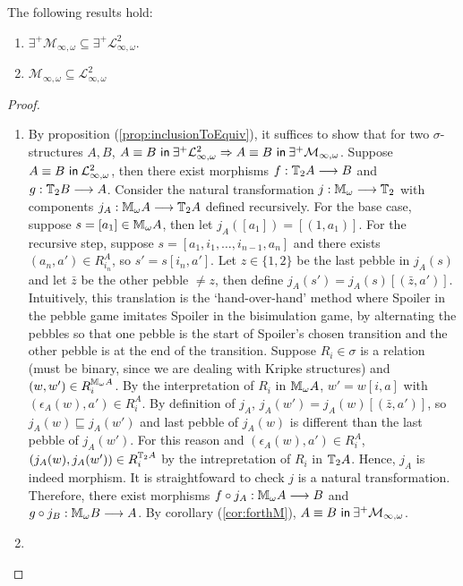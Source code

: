 \begin{prop}
The following results hold:
\begin{enumerate}[label=(\arabic*)]
\item $\exists^{+}\mathcal{M}_{\infty,\omega} \subseteq \exists^{+}\mathcal{L}^{2}_{\infty,\omega}$.
\item $\mathcal{M}_{\infty,\omega} \subseteq \mathcal{L}^{2}_{\infty,\omega}$
\end{enumerate}
\begin{proof}
\begin{enumerate}[label=(\arabic*)]
\item By proposition (\ref{prop:inclusionToEquiv}), it suffices to show that for two $\sigma$-structures $A,B$, ${A \equiv B \ \mathsf{in}\: \exists^{+}\mathcal{L}^{2}_{\infty,\omega}} \Rightarrow {A \equiv B \ \mathsf{in}\: \exists^{+}\mathcal{M}_{\infty,\omega}}$. Suppose ${A \equiv B \ \mathsf{in}\: \mathcal{L}^{2}_{\infty,\omega}}$, then there exist morphisms $f:{\mathbb{T}_{2}A} \longrightarrow B$ and $g:{\mathbb{T}_{2}B} \longrightarrow A$. Consider the natural transformation $j:{\mathbb{M}_{\omega}} \longrightarrow {\mathbb{T}_{2}}$ with components $j_{A}:{\mathbb{M}_{\omega}A} \longrightarrow {\mathbb{T}_{2}A}$ defined recursively. For the base case, suppose $s = [a_{1}] \in {\mathbb{M}_{\omega}A}$, then let $j_{A}([a_{1}]) = [(1,a_{1})]$. For the recursive step, suppose $s = [a_{1},i_{1},\dots,i_{n-1},a_{n}]$ and there exists $(a_{n},a') \in R_{i_{n}}^{A}$, so $s' = s[i_{n},a']$. Let $z \in \{1,2\}$ be the last pebble in $j_{A}(s)$ and let $\bar{z}$ be the other pebble $\not= z$, then define $j_{A}(s') = j_{A}(s)[(\bar{z},a')]$.  Intuitively, this translation is the `hand-over-hand' method where Spoiler in the pebble game imitates Spoiler in the bisimulation game, by alternating the pebbles so that one pebble is the start of Spoiler's chosen transition and the other pebble is at the end of the transition. Suppose $R_{i} \in \sigma$ is a relation (must be binary, since we are dealing with Kripke structures) and $(w,w') \in R_{i}^{{\mathbb{M}_{\omega}A}}$. By the interpretation of $R_{i}$ in ${\mathbb{M}_{\omega}A}$, $w' = w[i,a]$ with $(\epsilon_{A}(w),a') \in R_{i}^{A}$. By definition of $j_{A}$, $j_{A}(w') = j_{A}(w)[(\bar{z},a')]$, so $j_{A}(w) \sqsubseteq j_{A}(w')$ and last pebble of $j_{A}(w)$ is different than the last pebble of $j_{A}(w')$. For this reason and $(\epsilon_{A}(w),a') \in R_{i}^{A}$, $(j_{A}(w),j_{A}(w')) \in R_{i}^{{\mathbb{T}_{2}A}}$ by the intrepretation of $R_{i}$ in ${\mathbb{T}_{2}A}$. Hence, $j_{A}$ is indeed morphism. It is straightfoward to check $j$ is a natural transformation. Therefore, there exist morphisms $f \circ j_{A}: {\mathbb{M}_{\omega}A} \longrightarrow B$ and $g \circ j_{B}:{\mathbb{M}_{\omega}B} \longrightarrow A$. By corollary (\ref{cor:forthM}), ${A \equiv B \ \mathsf{in}\: \exists^{+}\mathcal{M}_{\infty,\omega}}$. 
\item   
\end{enumerate}
\end{proof}
\end{prop}
